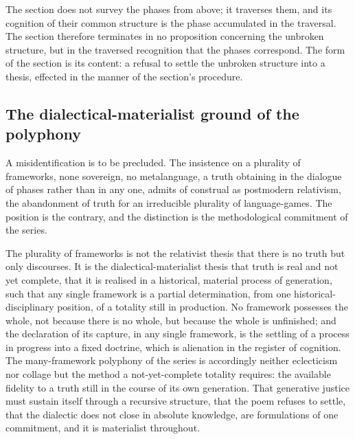 \begin{claim}
The section does not survey the phases from above; it traverses them, and its cognition of their common structure is the phase accumulated in the traversal. The section therefore terminates in no proposition concerning the unbroken structure, but in the traversed recognition that the phases correspond. The form of the section is its content: a refusal to settle the unbroken structure into a thesis, effected in the manner of the section's procedure.
\end{claim}

\subsection{The dialectical-materialist ground of the polyphony}
\label{p10:sec:dialmat}

A misidentification is to be precluded. The insistence on a plurality of frameworks, none sovereign, no metalanguage, a truth obtaining in the dialogue of phases rather than in any one, admits of construal as postmodern relativism, the abandonment of truth for an irreducible plurality of language-games. The position is the contrary, and the distinction is the methodological commitment of the series.

\begin{claim}
The plurality of frameworks is not the relativist thesis that there is no truth but only discourses. It is the dialectical-materialist thesis that truth is real and not yet complete, that it is realised in a historical, material process of generation, such that any single framework is a partial determination, from one historical-disciplinary position, of a totality still in production. No framework possesses the whole, not because there is no whole, but because the whole is unfinished; and the declaration of its capture, in any single framework, is the settling of a process in progress into a fixed doctrine, which is alienation in the register of cognition. The many-framework polyphony of the series is accordingly neither eclecticism nor collage but the method a not-yet-complete totality requires: the available fidelity to a truth still in the course of its own generation. That generative justice must sustain itself through a recursive structure, that the poem refuses to settle, that the dialectic does not close in absolute knowledge, are formulations of one commitment, and it is materialist throughout.
\end{claim}

